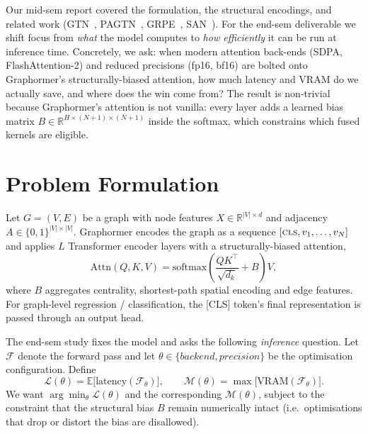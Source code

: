 \documentclass[11pt]{article}
\begin{document}
Our mid-sem report covered the formulation, the structural encodings, and
related work (GTN~\cite{gtn}, PAGTN~\cite{pagtn}, GRPE~\cite{grpe},
SAN~\cite{san}). For the end-sem deliverable we shift focus from
\emph{what} the model computes to \emph{how efficiently} it can be run at
inference time. Concretely, we ask: when modern attention back-ends
(SDPA, FlashAttention-2) and reduced precisions (fp16, bf16) are bolted
onto Graphormer's structurally-biased attention, how much latency and VRAM
do we actually save, and where does the win come from? The result is
non-trivial because Graphormer's attention is not vanilla: every layer
adds a learned bias matrix
$B \in \mathbb{R}^{H \times (N{+}1) \times (N{+}1)}$ inside the softmax,
which constrains which fused kernels are eligible.

\section{Problem Formulation}

Let $G = (V,E)$ be a graph with node features $X \in \mathbb{R}^{|V| \times d}$
and adjacency $A \in \{0,1\}^{|V| \times |V|}$. Graphormer encodes the
graph as a sequence $[\textsc{cls}, v_1, \dots, v_N]$ and applies $L$
Transformer encoder layers with a structurally-biased attention,
\begin{equation}
\mathrm{Attn}(Q,K,V) = \mathrm{softmax}\!\left(\frac{QK^{\top}}{\sqrt{d_k}} + B\right) V,
\end{equation}
where $B$ aggregates centrality, shortest-path spatial encoding and edge
features. For graph-level regression / classification, the [CLS] token's
final representation is passed through an output head.

The end-sem study fixes the model and asks the following \emph{inference}
question. Let $\mathcal{F}$ denote the forward pass and let
$\theta \in \{\textit{backend}, \textit{precision}\}$ be the optimisation
configuration. Define
\[
\mathcal{L}(\theta) = \mathbb{E}\big[\mathrm{latency}(\mathcal{F}_\theta)\big],
\qquad
\mathcal{M}(\theta) = \max\big[\mathrm{VRAM}(\mathcal{F}_\theta)\big].
\]
We want
$\arg\min_{\theta} \mathcal{L}(\theta)$ and the corresponding
$\mathcal{M}(\theta)$, subject to the constraint that the structural bias
$B$ remain numerically intact (i.e.\ optimisations that drop or distort the
bias are disallowed).

\end{document}
